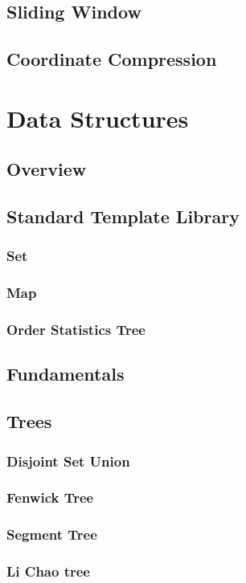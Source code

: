 \documentclass[titlepage]{article}
\begin{document}
\subsection{Sliding Window}
\subsection{Coordinate Compression}

\section{Data Structures}
\subsection{Overview}
\subsection{Standard Template Library}
\subsubsection{Set}
\subsubsection{Map}
\subsubsection{Order Statistics Tree}
\subsection{Fundamentals}
\subsection{Trees}
\subsubsection{Disjoint Set Union}
\subsubsection{Fenwick Tree}
\subsubsection{Segment Tree}
\subsubsection{Li Chao tree}
\end{document}
